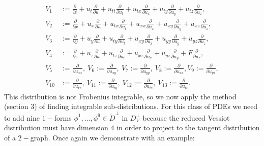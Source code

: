 \documentclass[a4paper, 11pt]{amsart}
\theoremstyle{definition}
\begin{document}
\begin{align}
V_1&:={\frac{\partial}{\partial{t}}}+u_{t}{\frac{\partial}{\partial{u}}}+u_{tt}{\frac{\partial}{\partial{u_{t}}}}+u_{{t}{x}}{\frac{\partial}{\partial{u_{x}}}}+u_{ty}{\frac{\partial}{\partial{u_{y}}}}+u_{tz}{\frac{\partial}{\partial{u_{z}}}},\nonumber\\
V_2&:={\frac{\partial}{\partial{x}}}+u_{x}{\frac{\partial}{\partial{u}}}+u_{tx}{\frac{\partial}{\partial{u_{t}}}}+u_{{x}{x}}{\frac{\partial}{\partial{u_{x}}}}+u_{xy}{\frac{\partial}{\partial{u_{y}}}}+u_{xz}{\frac{\partial}{\partial{u_{z}}}},\nonumber\\
V_3&:={\frac{\partial}{\partial{y}}}+u_{y}{\frac{\partial}{\partial{u}}}+u_{ty}{\frac{\partial}{\partial{u_{t}}}}+u_{xy}{\frac{\partial}{\partial{u_{x}}}}+u_{yy}{\frac{\partial}{\partial{u_{y}}}}+u_{yz}{\frac{\partial}{\partial{u_{z}}}},\label{4Vessiot dist}\\
V_4&:={\frac{\partial}{\partial{z}}}+u_{z}{\frac{\partial}{\partial{u}}}+u_{tz}{\frac{\partial}{\partial{u_{t}}}}+u_{xz}{\frac{\partial}{\partial{u_{x}}}}+u_{yz}{\frac{\partial}{\partial{u_{y}}}}+F{\frac{\partial}{\partial{u_{z}}}},\nonumber\\
V_5&:={\frac{\partial}{\partial{u_{xx}}}},~V_6:={\frac{\partial}{\partial{u_{xy}}}},~V_7:={\frac{\partial}{\partial{u_{yy}}}},~V_8:={\frac{\partial}{\partial{u_{xz}}}},V_9:={\frac{\partial}{\partial{u_{yz}}}},\nonumber\\
V_{10}&:={\frac{\partial}{\partial{u_{tx}}}},~V_{11}:={\frac{\partial}{\partial{u_{ty}}}},~V_{12}:={\frac{\partial}{\partial{u_{tz}}}},~V_{13}:={\frac{\partial}{\partial{u_{tt}}}}.\nonumber
\end{align}
This distribution is not Frobenius integrable, so we now apply the method (section $3$) of finding integrable sub-distributions.
For this class of PDEs we need to add nine $1-$forms $\phi^1,\ldots,\phi^9\in \acute{D}^{\bot}$ in $D^{\perp}_V$ because the reduced Vessiot distribution must have dimension $4$ in order to project to the tangent distribution of a $2-$graph. Once again we demonstrate with an example:
\end{document}
